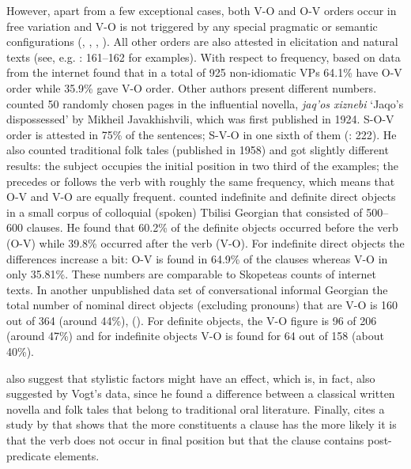 \documentclass[output=paper,colorlinks,citecolor=brown,draftmode]{langscibook}
\begin{document}
However, apart from a few exceptional cases, both V-O and O-V orders occur in free variation and V-O is not triggered by any special pragmatic or semantic configurations (\citealt{testelets_wordKartvelian_1998}, \citealt{asatiani_information_2012}, \citealt{skopeteas_word_2009}, \citealt{boeder_modern_2021}). All other orders are also attested in elicitation and natural texts (see, e.g. \citealt{pourtskhvanidze_fokuspartikeln_2015}: 161--162 for examples). With respect to frequency, based on data from the internet \citet{skopeteas_georgian_2021} found that in a total of 925 non-idiomatic VPs 64.1\% have O-V order while 35.9\% gave V-O order. Other authors present different numbers. \citet{vogt_grammaire_1971} counted 50 randomly chosen pages in the influential novella, \textit{jaq'os xiznebi} `Jaqo's dispossessed' by Mikheil Javakhishvili, which was first published in 1924. S-O-V order is attested in 75\% of the sentences; S-V-O in one sixth of them (\citealt{vogt_grammaire_1971}: 222). He also counted traditional folk tales (published in 1958) and got slightly different results: the subject occupies the initial position in two third of the examples; the  precedes or follows the verb with roughly the same frequency, which means that O-V and V-O are equally frequent. \citet[421]{stilo_areal_2014} counted indefinite and definite direct objects in a small corpus of colloquial (spoken) Tbilisi Georgian that consisted of 500--600 clauses. He found that 60.2\% of the definite objects occurred before the verb (O-V) while 39.8\% occurred after the verb (V-O). For indefinite direct objects the differences increase a bit: O-V is found in 64.9\% of the clauses whereas V-O in only 35.81\%. These numbers are comparable to Skopeteas counts of internet texts. In another unpublished data set of conversational informal Georgian the total number of nominal direct objects (excluding pronouns) that are V-O is 160 out of 364 (around 44\%), (\citealt{stilo_preverbal_2018}). For definite objects, the V-O figure is 96 of 206 (around 47\%) and for indefinite objects V-O is found for 64 out of 158 (about 40\%).

\citet{skopeteas_word_2009} also suggest that stylistic factors might have an effect, which is, in fact, also suggested by Vogt's data, since he found a difference between a classical written novella and folk tales that belong to traditional oral literature. Finally, \citet{skopeteas_georgian_2021} cites a study by \citet{apridonidze_sitqvatganlageba_1986} that shows that the more constituents a clause has the more likely it is that the verb does not occur in final position but that the clause contains post-predicate elements.
\end{document}
